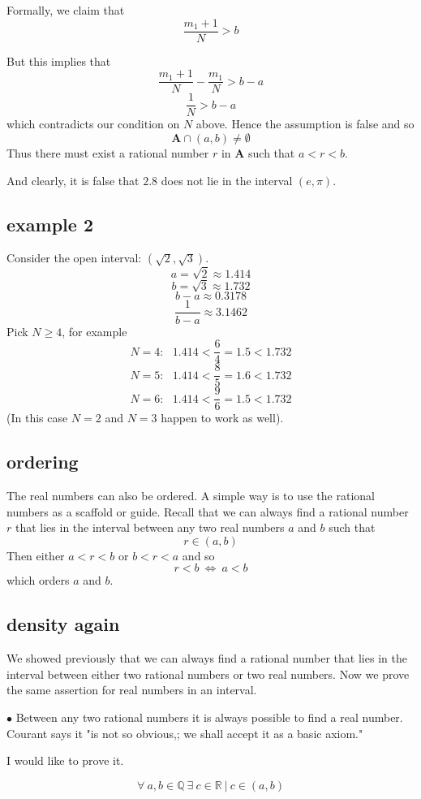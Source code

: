 \documentclass[11pt, oneside]{article}
\begin{document}
Formally, we claim that
\[ \frac{m_1 + 1}{N} > b \]

But this implies that
\[ \frac{m_1 + 1}{N} - \frac{m_1}{N} > b - a \]
\[ \frac{1}{N} > b - a \]
which contradicts our condition on $N$ above.  Hence the assumption is false and so
\[ \mathbf{A} \cap (a,b) \ne \emptyset \]
Thus there must exist a rational number $r$ in $\mathbf{A}$ such that $a < r < b$.

And clearly, it is false that $2.8$ does not lie in the interval $(e, \pi)$.

\subsection*{example 2}
Consider the open interval:  $(\sqrt{2},\sqrt{3})$.  
\[ a = \sqrt{2} \approx 1.414 \]
\[ b = \sqrt{3} \approx 1.732 \]
\[ b-a \approx 0.3178 \]
\[ \frac{1}{b-a} \approx 3.1462 \]
Pick $N \ge 4$, for example
\[ N = 4: \ \ \  1.414 < \frac{6}{4} = 1.5 < 1.732 \]
\[ N = 5: \ \ \  1.414 < \frac{8}{5} = 1.6 < 1.732 \]
\[ N = 6: \ \ \  1.414 < \frac{9}{6} = 1.5 < 1.732 \]
(In this case $N=2$ and $N=3$ happen to work as well).

\subsection*{ordering}
The real numbers can also be ordered.  A simple way is to use the rational numbers as a scaffold or guide.  Recall that we can always find a rational number $r$ that lies in the interval between any two real numbers $a$ and $b$ such that 
\[ r \in (a,b) \]
Then either $a < r < b$ or $b < r < a$ and so
\[ r < b \ \iff \ a < b \]
which orders $a$ and $b$.

\subsection*{density again}
We showed previously that we can always find a rational number that lies in the interval between either two rational numbers or two real numbers.  Now we prove the same assertion for real numbers in an interval.

$\bullet$  Between any two rational numbers it is always possible to find a real number.  Courant says it "is not so obvious,;  we shall accept it as a basic axiom."

I would like to prove it.

\[ \forall \ a,b \in \mathbb{Q} \ \exists \ c \in \mathbb{R} \ | \ c \in (a,b) \]
\end{document}
